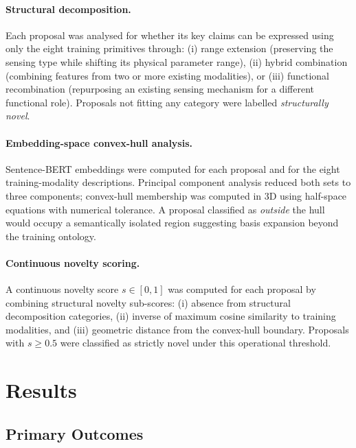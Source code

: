 \documentclass[pdflatex,sn-mathphys-num]{sn-jnl}
\begin{document}
\paragraph{Structural decomposition.}
Each proposal was analysed for whether its key claims can be expressed using only the eight
training primitives through: (i) range extension (preserving the sensing type while shifting
its physical parameter range), (ii) hybrid combination (combining features from two or more
existing modalities), or (iii) functional recombination (repurposing an existing sensing
mechanism for a different functional role).  Proposals not fitting any category were labelled
\emph{structurally novel}.

\paragraph{Embedding-space convex-hull analysis.}
Sentence-BERT embeddings were computed for each proposal and for the eight training-modality
descriptions.  Principal component analysis reduced both sets to three components; convex-hull
membership was computed in 3D using half-space equations with numerical tolerance.  A proposal
classified as \emph{outside} the hull would occupy a semantically isolated region suggesting
basis expansion beyond the training ontology.

\paragraph{Continuous novelty scoring.}
A continuous novelty score $s \in [0,1]$ was computed for each proposal by combining
structural novelty sub-scores: (i) absence from structural decomposition categories, (ii)
inverse of maximum cosine similarity to training modalities, and (iii) geometric distance from
the convex-hull boundary.  Proposals with $s \geq 0.5$ were classified as strictly novel under
this operational threshold.

\section{Results}
\label{sec:results}

\subsection{Primary Outcomes}
\end{document}
